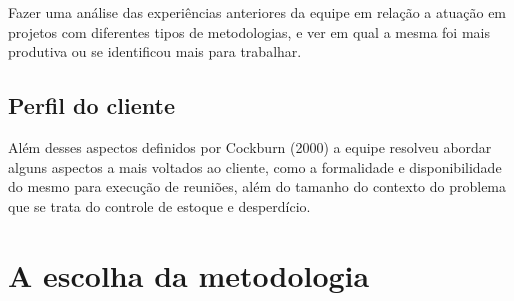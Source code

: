 Fazer uma análise das experiências anteriores da equipe em relação a atuação em projetos com diferentes tipos de metodologias, e ver em qual a mesma foi mais produtiva ou se identificou mais para trabalhar.


\subsection{Perfil do cliente}
Além desses aspectos definidos por Cockburn (2000) a equipe resolveu abordar alguns aspectos a mais voltados ao cliente, como a formalidade e disponibilidade do mesmo para execução de reuniões, além do tamanho do contexto do problema que se trata do controle de estoque e desperdício.


\section{A escolha da metodologia}

